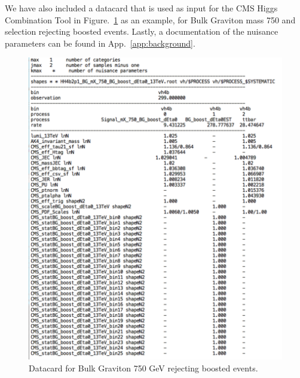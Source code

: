 We have also included a datacard that is used as input for the CMS Higgs Combination Tool in Figure.~\ref{fig:datacard} as an example, for Bulk Graviton mass 750 and selection rejecting boosted events. Lastly, a documentation of the nuisance parameters can be found in App.~\ref{app:background}.

\begin{figure}[thb!]
\begin{center}
\includegraphics[scale=0.5]{Figures/datacardForNote.pdf}
\end{center}
\caption{Datacard for Bulk Graviton 750 GeV rejecting boosted events.}
\label{fig:datacard}
\end{figure} 



